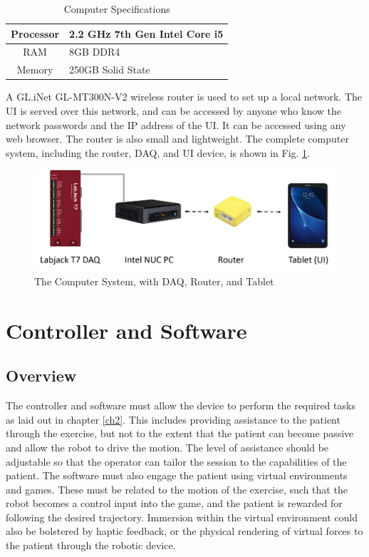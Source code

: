 \documentclass[12pt]{report}
\begin{document}
	
	\begin{table}[h]
	\centering
	\caption{Computer Specifications}	
	\begin{tabular}{|c|l|}
		\hline
		Processor & 2.2 GHz 7th Gen Intel Core i5 \\ \hline
		RAM & 8GB DDR4 \\ \hline
		Memory & 250GB Solid State \\ \hline
		\end{tabular}
	\label{tab:comp}
	\end{table}
	
	 
	A GL.iNet GL-MT300N-V2 wireless router is used to set up a local network. The UI is served over this network, and can be accessed by anyone who know the network passwords and the IP address of the UI. It can be accessed using any web browser. The router is also small and lightweight. The complete computer system, including the router, DAQ, and UI device, is shown in Fig. \ref{fig:comp}. 
	


	\begin{figure}[h] 
		\centering
		\includegraphics[width=\linewidth]{computer_system}
		\caption{The Computer System, with DAQ, Router, and Tablet}
		\label{fig:comp}
	\end{figure}
	
	
		
\chapter{Controller and Software} \label{ch3}


	\section{Overview}
	
	The controller and software must allow the device to perform the required tasks as laid out in chapter \ref{ch2}. This includes providing assistance to the patient through the exercise, but not to the extent that the patient can become passive and allow the robot to drive the motion. The level of assistance should be adjustable so that the operator can tailor the session to the capabilities of the patient. The software must also engage the patient using virtual environments and games. These must be related to the motion of the exercise, such that the robot becomes a control input into the game, and the patient is rewarded for following the desired trajectory. Immersion within the virtual environment could also be bolstered by haptic feedback, or the physical rendering of virtual forces to the patient through the robotic device. 
	
\end{document}
